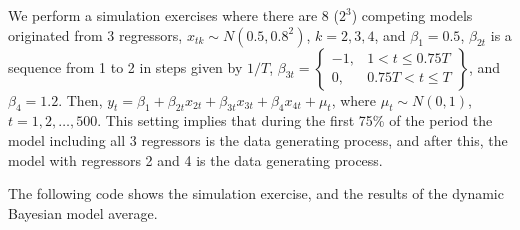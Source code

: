We perform a simulation exercises where there are 8 ($2^3$) competing models originated from 3 regressors, $x_{tk}\sim N(0.5,0.8^2)$, $k=2,3,4$, and $\beta_1=0.5$, $\beta_{2t}$ is a sequence from 1 to 2 in steps given by $1/T$, $\beta_{3t}=\begin{Bmatrix}
	-1, & 1<t\leq 0.75T\\
	0, & 0.75T< t \leq T
\end{Bmatrix}$, and $\beta_4=1.2$. Then, $y_t=\beta_1+\beta_{2t}x_{2t}+\beta_{3t}x_{3t}+\beta_{4}x_{4t}+\mu_t$, where $\mu_t\sim N(0,1)$, $t=1,2,\dots,500$. This setting implies that during the first 75\% of the period the model including all 3 regressors is the data generating process, and after this, the model with regressors 2 and 4 is the data generating process.

The following code shows the simulation exercise, and the results of the dynamic Bayesian model average.

